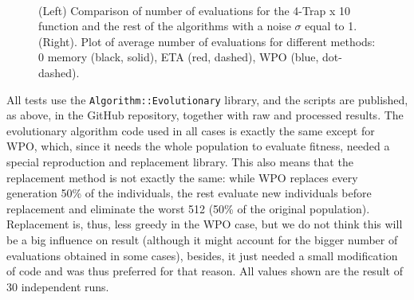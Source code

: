 \documentclass{llncs}
\begin{document}
\begin{figure}[h!tb]
\centering
{}
~
\caption{(Left) Comparison of number of evaluations for the 4-Trap x
  10 function and the rest of the algorithms with a noise $\sigma$
  equal to 1. (Right). Plot of average number of evaluations for
  different methods: 0 memory (black, solid), ETA (red, dashed), WPO
  (blue, dot-dashed). \label{fig:trap:evals}}
\end{figure}
%
All tests use the {\tt Algorithm::Evolutionary} library, and the scripts
are published, as above, in the GitHub repository, together with raw
and processed results. The evolutionary algorithm code used in all
cases is exactly the same except for WPO, which, since it needs the
whole population to evaluate fitness, needed a special reproduction
and replacement library. This also means that the replacement method
is not exactly the same: while WPO replaces every generation 50\% of
the individuals, the rest evaluate new individuals before replacement
and eliminate the worst 512 (50\% of the original
population). Replacement is, thus, less greedy in the WPO case, but
we do not think this will be a big influence on result (although it
might account for the bigger number of evaluations obtained in some
cases), besides, it just needed a small modification of code and was
thus preferred for that reason. All values shown are the result of 30
independent runs.
\end{document}
